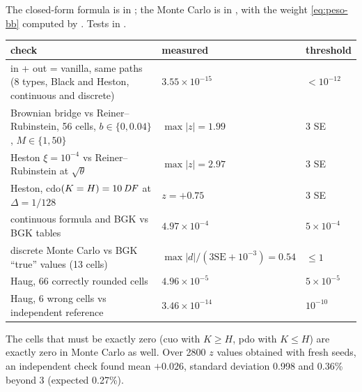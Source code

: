 \begin{progetto}[title={In the qpricer project: code and results}]
The closed-form formula is  in ; the Monte Carlo is
 in , with the weight \eqref{eq:peso-bb} computed by
. Tests in .
\begin{center}
\small
\begin{tabularx}{\textwidth}{>{\raggedright\arraybackslash}Xll}
\toprule
check & measured & threshold\\
\midrule
in + out = vanilla, same paths (8 types, Black and Heston, continuous and discrete) & $3.55\times10^{-15}$ &
$<10^{-12}$\\
Brownian bridge vs Reiner--Rubinstein, 56 cells, $b\in\{0,0.04\}$, $M\in\{1,50\}$ & $\max|z|=1.99$ & 3 SE\\
Heston $\xi=10^{-4}$ vs Reiner--Rubinstein at $\sqrt\theta$ & $\max|z|=2.97$ & 3 SE\\
Heston, cdo$(K=H)=10\,\mathit{DF}$ at $\Delta=1/128$ & $z=+0.75$ & 3 SE\\
continuous formula and BGK vs BGK tables & $4.97\times10^{-4}$ & $5\times10^{-4}$\\
discrete Monte Carlo vs BGK ``true'' values (13 cells) & $\max|d|/(3\mathrm{SE}+10^{-3})=0.54$ & $\le1$\\
Haug, 66 correctly rounded cells & $4.96\times10^{-5}$ & $5\times10^{-5}$\\
Haug, 6 wrong cells vs independent reference & $3.46\times10^{-14}$ & $10^{-10}$\\
\bottomrule
\end{tabularx}
\end{center}
The cells that must be exactly zero (cuo with $K\ge H$, pdo with $K\le H$) are exactly zero in Monte Carlo as well.
Over 2800 $z$ values obtained with fresh seeds, an independent check found mean $+0.026$, standard deviation 0.998 and
0.36\% beyond 3 (expected 0.27\%).
\end{progetto}

